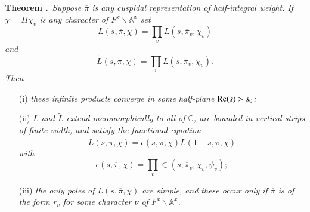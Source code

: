\noindent
{\bf Theorem .\label{art1-thm13.3}}~{\em Suppose $\overline{\pi}$ is any cuspidal representation of half-integral weight. If $\chi=\Pi \chi_{v}$ is any character of $F^{x}\backslash \mathbb{A}^{x}$ set}
$$
L(s,\overline{\pi},\chi)=\prod\limits_{v}L(s,\overline{\pi}_{v},\chi_{v})
$$
{\em and}
$$
\widetilde{L}(s,\overline{\pi},\chi)=\prod\limits_{v}\widetilde{L}(s,\overline{\pi}_{v},\chi_{v}).
$$
{\em Then}
\begin{itemize}
\item[(i)] {\em these infinite products converge in some half-plane $\mathrm{Re}(s)>s_{0}$;}

\item[(ii)] {\em $L$ and $\widetilde{L}$ extend meromorphically to all of $\mathbb{C}$, are bounded in vertical strips of finite width, and satisfy the functional equation}
$$
L(s,\overline{\pi},\chi)=\epsilon(s,\overline{\pi},\chi)\widetilde{L}(1-s,\overline{\pi},\chi)
$$
{\em with}
$$
\epsilon(s,\overline{\pi},\chi)=\prod\limits_{v}\in (s,\overline{\pi}_{v},\chi_{v},\psi_{v});
$$

\item[(iii)] {\em the only poles of $L(s,\overline{\pi},\chi)$ are simple, and these occur only if $\overline{\pi}$ is of the form $r_{v}$ for some character $\nu$ of $F^{x}\backslash \mathbb{A}^{x}$.}
\end{itemize}

